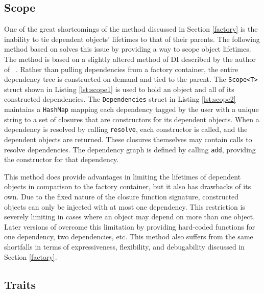 \documentclass[sigconf]{acmart}
\begin{document}
\subsection{Scope} \label{scope}
One of the great shortcomings of the method discussed in Section \ref{factory} is the inability to tie dependent objects' lifetimes to that of their parents. The following method based on \cite{di-rs} solves this issue by providing a way to scope object lifetimes. The method is based on a slightly altered method of DI described by the author of \cite{di-rs}~\cite{inceptor}. Rather than pulling dependencies from a factory container, the entire dependency tree is constructed on demand and tied to the parent. The \lstinline{Scope<T>} struct shown in Listing \ref{lst:scope1} is used to hold an object and all of its constructed dependencies. The \lstinline{Dependencies} struct in Listing \ref{lst:scope2} maintains a \lstinline{HashMap} mapping each dependency tagged by the user with a unique string to a set of closures that are constructors for its dependent objects. When a dependency is resolved by calling \lstinline{resolve}, each constructor is called, and the dependent objects are returned. These closures themselves may contain calls to resolve dependencies. The dependency graph is defined by calling \lstinline{add}, providing the constructor for that dependency.

\begin{minipage}{\linewidth}

\end{minipage}


This method does provide advantages in limiting the lifetimes of dependent objects in comparison to the factory container, but it also has drawbacks of its own. Due to the fixed nature of the closure function signature, constructed objects can only be injected with at most one dependency. This restriction is severely limiting in cases where an object may depend on more than one object. Later versions of \cite{di-rs} overcome this limitation by providing hard-coded functions for one dependency, two dependencies, etc. This method also suffers from the same shortfalls in terms of expressiveness, flexibility, and debugability discussed in Section \ref{factory}.

\subsection{Traits}
\end{document}
